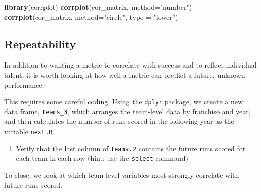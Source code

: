 \documentclass[]{article}
\newenvironment{Shaded}{\begin{snugshade}}{\end{snugshade}}
\newcommand{\DataTypeTok}[1]{\textcolor[rgb]{0.13,0.29,0.53}{#1}}
\newcommand{\DecValTok}[1]{\textcolor[rgb]{0.00,0.00,0.81}{#1}}
\newcommand{\KeywordTok}[1]{\textcolor[rgb]{0.13,0.29,0.53}{\textbf{#1}}}
\newcommand{\NormalTok}[1]{#1}
\newcommand{\OperatorTok}[1]{\textcolor[rgb]{0.81,0.36,0.00}{\textbf{#1}}}
\newcommand{\StringTok}[1]{\textcolor[rgb]{0.31,0.60,0.02}{#1}}
\providecommand{\tightlist}{%
  \setlength{\itemsep}{0pt}\setlength{\parskip}{0pt}}
\begin{document}
\begin{Shaded}
\begin{Highlighting}[]
\KeywordTok{library}\NormalTok{(corrplot)}
\KeywordTok{corrplot}\NormalTok{(cor_matrix, }\DataTypeTok{method=}\StringTok{"number"}\NormalTok{)}
\KeywordTok{corrplot}\NormalTok{(cor_matrix, }\DataTypeTok{method=}\StringTok{"circle"}\NormalTok{, }\DataTypeTok{type =} \StringTok{"lower"}\NormalTok{)}
\end{Highlighting}
\end{Shaded}

\hypertarget{repeatability}{%
\subsection{Repeatability}\label{repeatability}}

In addition to wanting a metric to correlate with success and to reflect
individual talent, it is worth looking at how well a metric can predict
a future, unknown performance.

This requires some careful coding. Using the \texttt{dplyr} package, we
create a new data frame, \texttt{Teams\_3}, which arranges the
team-level data by franchise and year, and then calculates the number of
runs scored in the following year as the variable \texttt{next.R}.

\begin{Shaded}
\end{Shaded}

\begin{enumerate}
\def\labelenumi{\arabic{enumi}.}
\setcounter{enumi}{12}
\tightlist
\item
  Verify that the last column of \texttt{Teams.2} contains the future
  runs scored for each team in each row (hint: use the \texttt{select}
  command)
\end{enumerate}

To close, we look at which team-level variables most strongly correlate
with future runs scored.
\end{document}
